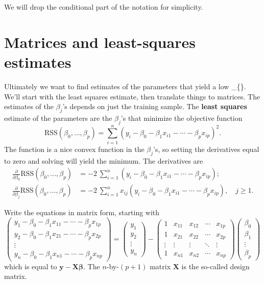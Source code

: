 \documentclass[
]{book}
\begin{document}
We will drop the conditional part of the notation for simplicity.

\hypertarget{matrix-section}{%
\section{Matrices and least-squares estimates}\label{matrix-section}}

Ultimately we want to find estimates of the parameters that yield a low \_\{\}. We'll start with the least squares estimate, then translate things to matrices. The estimates of the \(\beta_j\)'s depends on just the training sample. The
\textbf{least squares} estimate of the parameters are the \(\beta_j\)'s that minimize the objective function
\begin{equation}
\text{RSS}(\beta_0,\ldots,\beta_p) = \sum_{i=1}^n (y_i-\beta_0- \beta_1 x_{i1}-\cdots- \beta_p x_{ip})^2.
\label{eq:lm9}
\end{equation}
The function is a nice convex function in the \(\beta_j\)'s, so setting the derivatives equal to zero and solving will yield the minimum. The derivatives are
\begin{align}
\frac{\partial}{\partial \beta_0} \text{RSS} (\beta_0,\ldots,\beta_p) &= -2~\sum_{i=1}^n (y_i-\beta_0-\beta_1 x_{i1}-\cdots-\beta_p x_{ip});\\
\frac{\partial}{\partial \beta_j} \text{RSS} (\beta_0,\ldots,\beta_p) &= -2~\sum_{i=1}^n x_{ij}(y_i-\beta_0-\beta_1 x_{i1}-\cdots-\beta_p x_{ip}), \quad j\ge1.
\label{eq:lm10}
\end{align}

Write the equations in matrix form, starting with
\begin{equation}
\begin{pmatrix}
y_1-\beta_0-\beta_1 x_{11}-\cdots-\beta_p x_{1p}\\
y_2-\beta_0-\beta_1 x_{21}-\cdots-\beta_p x_{2p}\\
\vdots\\
y_n-\beta_0-\beta_1 x_{n1}-\cdots-\beta_p x_{np}
\end{pmatrix} =
\begin{pmatrix}
y_1\\y_2\\\vdots\\y_n
\end{pmatrix} - 
\begin{pmatrix}
1&x_{11}&x_{12}&\cdots&x_{1p}\\
1&x_{21}&x_{22}&\cdots&x_{2p}\\
\vdots&\vdots&\vdots&\ddots&\vdots\\
1&x_{n1}&x_{n2}&\cdots&x_{np}
\end{pmatrix}
\begin{pmatrix}
\beta_0\\\beta_1\\\vdots\\\beta_p
\end{pmatrix} 
\label{eq:lm11}
\end{equation}
which is equal to \(\mathbf{y} - \mathbf{X}\boldsymbol{\beta}\). The \(n\)-by-\((p+1)\) matrix \(\mathbf{X}\) is the so-called design matrix.
\end{document}
